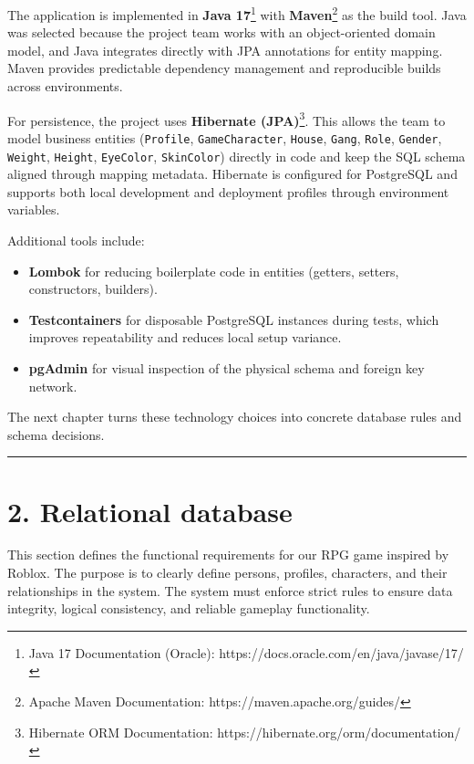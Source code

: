 The application is implemented in \textbf{Java 17}\footnote{Java 17
  Documentation (Oracle): https://docs.oracle.com/en/java/javase/17/}
with \textbf{Maven}\footnote{Apache Maven Documentation:
  https://maven.apache.org/guides/} as the build tool. Java was selected
because the project team works with an object-oriented domain model, and
Java integrates directly with JPA annotations for entity mapping. Maven
provides predictable dependency management and reproducible builds
across environments.

For persistence, the project uses \textbf{Hibernate (JPA)}\footnote{Hibernate
  ORM Documentation: https://hibernate.org/orm/documentation/}. This
allows the team to model business entities (\texttt{Profile},
\texttt{GameCharacter}, \texttt{House}, \texttt{Gang}, \texttt{Role},
\texttt{Gender}, \texttt{Weight}, \texttt{Height}, \texttt{EyeColor},
\texttt{SkinColor}) directly in code and keep the SQL schema aligned
through mapping metadata. Hibernate is configured for PostgreSQL and
supports both local development and deployment profiles through
environment variables.

Additional tools include:

\begin{itemize}
\tightlist
\item
  \textbf{Lombok} for reducing boilerplate code in entities (getters,
  setters, constructors, builders).
\item
  \textbf{Testcontainers} for disposable PostgreSQL instances during
  tests, which improves repeatability and reduces local setup variance.
\item
  \textbf{pgAdmin} for visual inspection of the physical schema and
  foreign key network.
\end{itemize}

The next chapter turns these technology choices into concrete database
rules and schema decisions.

\begin{center}\rule{0.5\linewidth}{0.5pt}\end{center}

\newpage

\hypertarget{relational-database}{%
\section{2. Relational database}\label{relational-database}}

This section defines the functional requirements for our RPG game
inspired by Roblox. The purpose is to clearly define persons, profiles,
characters, and their relationships in the system. The system must
enforce strict rules to ensure data integrity, logical consistency, and
reliable gameplay functionality.

